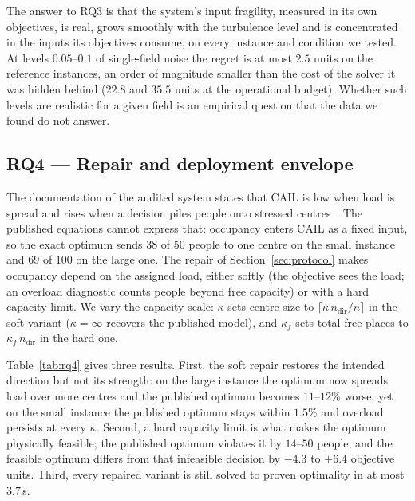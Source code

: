 \documentclass[systems,article,submit,moreauthors,pdftex]{Definitions/mdpi}
\begin{document}
The answer to RQ3 is that the system's input fragility, measured in its own objectives, is real,
grows smoothly with the turbulence level and is concentrated in the inputs its objectives consume,
on every instance and condition we tested. At levels $0.05$--$0.1$ of single-field noise the regret
is at most $2.5$ units on the reference instances, an order of magnitude smaller than the cost of
the solver it was hidden behind ($22.8$ and $35.5$ units at the operational budget). Whether such
levels are realistic for a given field is an empirical question that the data we found do not
answer.

\subsection{RQ4 --- Repair and deployment envelope}\label{sec:rq4}
The documentation of the audited system states that CAIL is low when load is spread and
rises when a decision piles people onto stressed centres~\cite{rabiei2026resilient}. The
published equations cannot express that: occupancy enters CAIL as a fixed input, so the
exact optimum sends $38$ of $50$ people to one centre on the small instance and $69$ of
$100$ on the large one. The repair of Section~\ref{sec:protocol} makes occupancy depend on
the assigned load, either softly (the objective sees the load; an overload diagnostic counts
people beyond free capacity) or with a hard capacity limit. We vary the capacity scale:
$\kappa$ sets centre size to $\lceil\kappa\, n_{\mathrm{dir}}/n\rceil$ in the soft variant
($\kappa = \infty$ recovers the published model), and $\kappa_f$ sets total free places to
$\kappa_f\, n_{\mathrm{dir}}$ in the hard one.

Table~\ref{tab:rq4} gives three results. First, the soft repair restores the intended
direction but not its strength: on the large instance the optimum now spreads load over more
centres and the published optimum becomes $11$--$12\%$ worse, yet on the small instance the
published optimum stays within $1.5\%$ and overload persists at every $\kappa$. Second, a hard
capacity limit is what makes the optimum physically feasible; the published optimum violates it
by $14$--$50$ people, and the feasible optimum differs from that infeasible decision by $-4.3$ to
$+6.4$ objective units. Third, every repaired variant is still solved to proven optimality in at
most $3.7$\,s.
\end{document}
